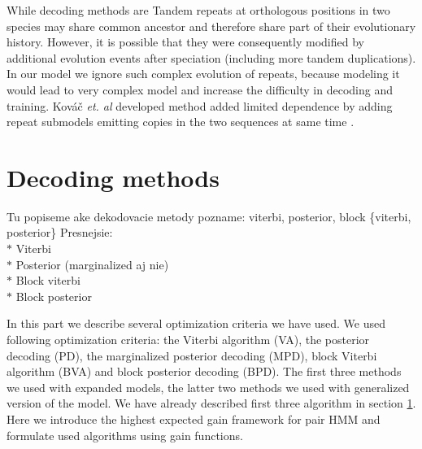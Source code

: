 While decoding methods are Tandem repeats at orthologous positions in two
species may share common ancestor and therefore share part of their evolutionary
history. However, it is possible that they were consequently modified by
additional evolution events after speciation (including more tandem
duplications). In our model we ignore such complex evolution of repeats, because
modeling it would lead to very complex model and increase the difficulty in
decoding and training. Kováč {\it et. al} developed method added limited
dependence by adding repeat submodels emitting copies in the two sequences at
same time \cite{Kovac2012}.


\section{Decoding methods}
\begin{reformulate*}
Tu popiseme ake dekodovacie metody pozname: viterbi, posterior, block \{viterbi,
posterior\}
Presnejsie:\\
$*$ Viterbi\\
$*$ Posterior (marginalized aj nie)\\
$*$ Block viterbi\\
$*$ Block posterior\\
\end{reformulate*}

In this part we describe several optimization criteria we have used. We used
following optimization criteria: the Viterbi algorithm (VA), the
posterior decoding (PD), the marginalized posterior decoding (MPD), block
Viterbi algorithm (BVA) and block posterior decoding (BPD). The first three
methods we used with expanded models, the latter two methods we used with
generalized version of the model. We have already described first three
algorithm in section \ref{}. Here we introduce the highest expected gain
framework for pair HMM and formulate used algorithms using gain functions.

